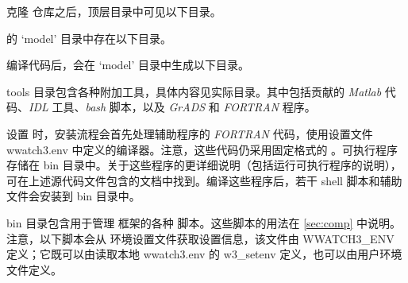 克隆 \ws{} 仓库之后，顶层目录中可见以下目录。

\begin{dlist}
\end{dlist}

\noindent \ws{} 的 `model' 目录中存在以下目录。

\begin{dlist}
\end{dlist}

\noindent 编译代码后，会在 `model' 目录中生成以下目录。

\begin{dlist}
\end{dlist}

\noindent

{\dir tools} 目录包含各种附加工具，具体内容见实际目录。其中包括贡献的 {\it Matlab} 代码、{\it IDL} 工具、{\it bash} 脚本，以及 {\it GrADS} 和 {\it FORTRAN} 程序。

设置 \ws{} 时，安装流程会首先处理辅助程序的 {\it FORTRAN} 代码，使用设置文件 {\file wwatch3.env} 中定义的编译器。注意，这些代码仍采用固定格式的 {}。可执行程序存储在 {\dir bin} 目录中。关于这些程序的更详细说明（包括运行可执行程序的说明），可在上述源代码文件包含的文档中找到。编译这些程序后，若干 \unix{} shell 脚本和辅助文件会安装到 {\dir bin} 目录中。

\begin{flist}


\end{flist}

{\dir bin} 目录包含用于管理 \ws{} 框架的各种 \unix{} 脚本。这些脚本的用法在 \para\ref{sec:comp} 中说明。注意，以下脚本会从 \ws{} 环境设置文件获取设置信息，该文件由 {\code WWATCH3\_ENV} 定义；它既可以由读取本地 {\file wwatch3.env} 的 {\file w3\_setenv} 定义，也可以由用户环境文件定义。

